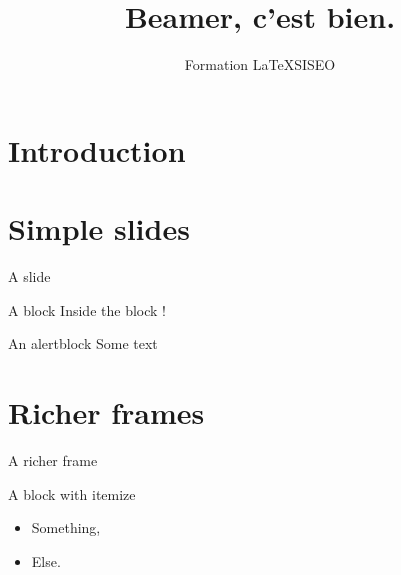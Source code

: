 \documentclass[10pt,a4paper, dvipsnames]{beamer}
\title{Beamer, c'est bien.}
\author{Formation \LaTeX SISEO}
\date{}
\begin{document}
\section{Introduction}
\begin{frame}
\titlepage
\end{frame}

\section{Simple slides}

\begin{frame}{A slide}

\begin{block}{A block}
Inside the block !
\end{block}

\begin{alertblock}{An alertblock}
Some text 
\end{alertblock}
\end{frame}

\section{Richer frames}
\begin{frame}{A richer frame}
  \begin{block}{A block with itemize}
    \begin{itemize}
      \item Something,
       \item Else.
    \end{itemize}
  \end{block}
\end{frame}
\end{document}
